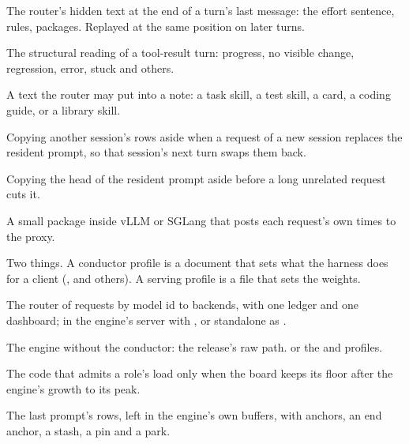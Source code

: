 \begin{description}[style=unboxed, leftmargin=0pt, itemsep=.5ex, font=\normalfont\bfseries]
\item[note] The router's hidden text at the end of a turn's last message: the effort sentence, rules, packages. Replayed at the same position on later turns.

\item[outcome] The structural reading of a tool-result turn: progress, no visible change, regression, error, stuck and others.

\item[package] A text the router may put into a note: a task skill, a test skill, a card, a coding guide, or a library skill.

\item[park] Copying another session's rows aside when a request of a new session replaces the resident prompt, so that session's next turn swaps them back.

\item[pin] Copying the head of the resident prompt aside before a long unrelated request cuts it.

\item[plugin] A small package inside vLLM or SGLang that posts each request's own times to the proxy.

\item[profile] Two things. A conductor profile is a document that sets what the harness does for a client (,  and others). A serving profile is a  file that sets the weights.

\item[proxy] The router of requests by model id to backends, with one ledger and one dashboard; in the engine's server with , or standalone as .

\item[raw] The engine without the conductor: the release's raw path.  or the  and  profiles.

\item[residency planner] The code that admits a role's load only when the board keeps its floor after the engine's growth to its peak.

\item[resident prefix] The last prompt's rows, left in the engine's own buffers, with anchors, an end anchor, a stash, a pin and a park.


\end{description}
